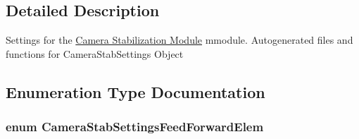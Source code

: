 \subsection{\-Detailed \-Description}
\-Settings for the \hyperlink{group___camera_stab}{\-Camera \-Stabilization \-Module} mmodule. \-Autogenerated files and functions for \-Camera\-Stab\-Settings \-Object 

\subsection{\-Enumeration \-Type \-Documentation}
\hypertarget{group___camera_stab_settings_ga4bc67d38a639b8e80e953191e3742b9c}{
\subsubsection[{\-Camera\-Stab\-Settings\-Feed\-Forward\-Elem}]{\setlength{\rightskip}{0pt plus 5cm}enum {\bf \-Camera\-Stab\-Settings\-Feed\-Forward\-Elem}}}\label{group___camera_stab_settings_ga4bc67d38a639b8e80e953191e3742b9c}
